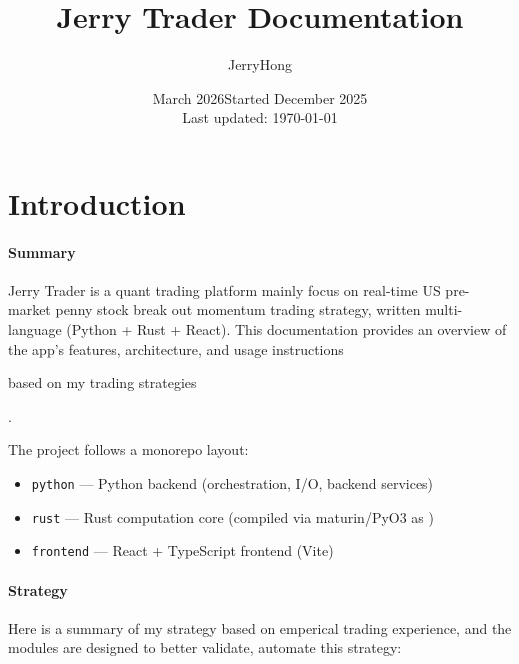 \documentclass[a4paper, 11pt]{article}
\title{Jerry Trader Documentation}
\author{JerryHong}
\date{March 2026}
\date{Started December 2025 \\ Last updated: \today}
\begin{document}
\maketitle

\pagebreak

\tableofcontents

\pagebreak

\section{Introduction}

\paragraph{Summary}
Jerry Trader is a quant trading platform mainly focus on real-time US pre-market penny stock break out momentum trading strategy,
written multi-language (Python + Rust + React).
This documentation provides an overview of the app's features, architecture, and usage instructions \begin{em}based on my trading strategies\end{em}.

The project follows a monorepo layout:

\begin{itemize}
\item \texttt{python} --- Python backend (orchestration, I/O, backend services)
\item \texttt{rust} --- Rust computation core (compiled via maturin/PyO3 as \texttt{})
\item \texttt{frontend} --- React + TypeScript frontend (Vite)
\end{itemize}

\paragraph{Strategy}
Here is a summary of my strategy based on emperical trading experience, and the modules are designed to better validate, automate this strategy:
\end{document}
